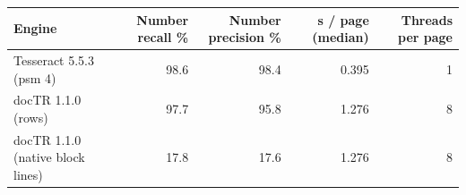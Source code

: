 \begin{tabular}{@{}lrrrr@{}}
\toprule
Engine & Number recall \% & Number precision \% & s / page (median) & Threads per page \\
\midrule
Tesseract 5.5.3 (psm 4) & 98.6 & 98.4 & 0.395 & 1 \\
docTR 1.1.0 (rows) & 97.7 & 95.8 & 1.276 & 8 \\
docTR 1.1.0 (native block lines) & 17.8 & 17.6 & 1.276 & 8 \\
\bottomrule
\end{tabular}
